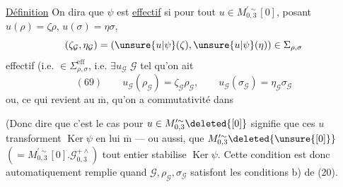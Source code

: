 
\uline{Définition} On dira que $\psi$ est \uline{effectif} si pour tout
$u\in M_{0,3}^{\prime\sim}[0]$, posant $u(\rho)=\zeta\rho$, $u(\sigma)=\eta\sigma$,
\[
 (\zeta_{\mathcal{G}},\eta_{\mathcal{G}})
 =(\unsure{u|\psi}(\zeta),\unsure{u|\psi}(\eta))\in\Sigma_{\rho,\sigma}
\]
effectif (i.e. $\in\Sigma_{\rho,\sigma}^{\mathrm{eff}}$, i.e. $\exists u_{\mathcal{G}}$  $\mathcal{G}$ tel qu'on ait 
\[
 (69)\qquad
 u_{\mathcal{G}}(\rho_{\mathcal{G}})=\zeta_{\mathcal{G}}\rho_{\mathcal{G}},
 \qquad
 u_{\mathcal{G}}(\sigma_{\mathcal{G}})=\eta_{\mathcal{G}}\sigma_{\mathcal{G}}
\]
ou, ce qui revient au $\overline{\mathrm m}$, qu'on a commutativité dans

(Donc dire que c'est le cas pour  $u\in M_{0,3}^{\prime\sim}\deleted{[0]}$ signifie que ces $u$ transforment $\operatorname{Ker}\psi$ en lui $\overline{\mathrm m}$ --- ou aussi, que
$M_{0,3}^{\prime\sim}\deleted{\unsure{[0]}}$
$(=M_{0,3}^{\prime\sim}[0].\mathcal{G}_{0,3}^{+\wedge})$ tout entier stabilise $\operatorname{Ker}\psi$.
 Cette condition est donc automatiquement remplie quand $\mathcal{G},\rho_{\mathcal{G}},\sigma_{\mathcal{G}}$ satisfont les conditions b) de (20).

